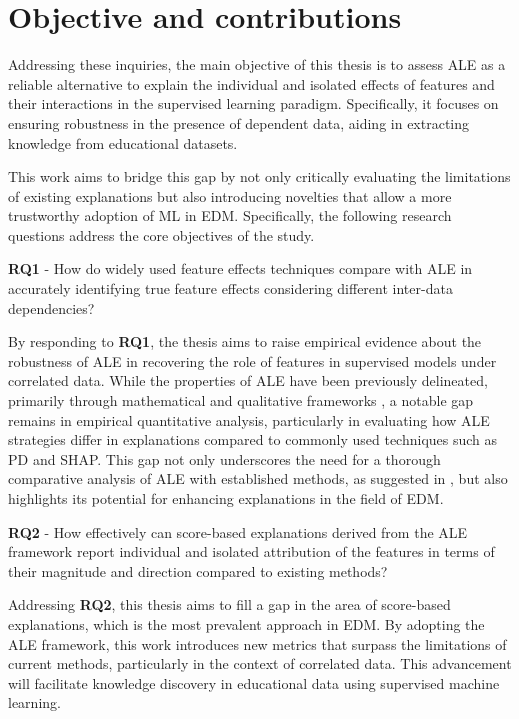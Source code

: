 \section{Objective and contributions}
\label{objetivos}

Addressing these inquiries, the main objective of this thesis is to assess \gls{ALE} as a reliable alternative to explain the individual and isolated effects of features and their interactions in the supervised learning paradigm. Specifically, it focuses on ensuring robustness in the presence of dependent data, aiding in extracting knowledge from educational datasets.


This work aims to bridge this gap by not only critically evaluating the limitations of existing explanations but also introducing novelties that allow a more trustworthy adoption of \gls{ML} in \gls{EDM}. Specifically, the following research questions address the core objectives of the study.

\textbf{RQ1} - How do widely used feature effects techniques compare with ALE in accurately identifying true feature effects considering different inter-data dependencies? 

By responding to \textbf{RQ1}, the thesis aims to raise empirical evidence about the robustness of \gls{ALE} in recovering the role of features in supervised models under correlated data. While the properties of \gls{ALE} have been previously delineated, primarily through mathematical and qualitative frameworks \cite{Apley2020VisualizingModels, molnar2019}, a notable gap remains in empirical quantitative analysis, particularly in evaluating how \gls{ALE} strategies differ in explanations compared to commonly used techniques such as \gls{PD} and \gls{SHAP}. This gap not only underscores the need for a thorough comparative analysis of \gls{ALE} with established methods, as suggested in \cite{Molnar2022GeneralModels}, but also highlights its potential for enhancing explanations in the field of \gls{EDM}.


\textbf{RQ2} - How effectively can score-based explanations derived from the \gls{ALE} framework report individual and isolated attribution of the features in terms of their magnitude and direction compared to existing methods?

Addressing \textbf{RQ2}, this thesis aims to fill a gap in the area of score-based explanations, which is the most prevalent approach in \gls{EDM}.  By adopting the ALE framework, this work introduces new metrics that surpass the limitations of current methods, particularly in the context of correlated data. This advancement will facilitate knowledge discovery in educational data using supervised machine learning.  

